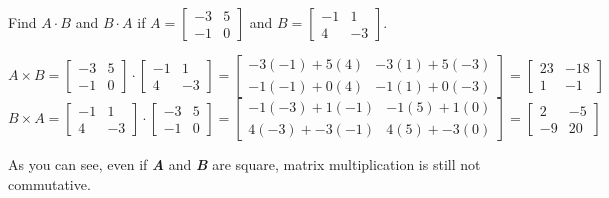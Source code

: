 \begin{Exercise}[title=Are Matrices Commutative?,label=mult_mat3]
    Find $\mathbf{\mathit{A}} \cdot \mathbf{\mathit{B}}$ and
    $\mathbf{\mathit{B}} \cdot \mathbf{\mathit{A}}$ if $\mathbf{\mathit{A}} =
    \begin{bmatrix}
    -3 & 5\\
    -1 & 0
    \end{bmatrix}$ and $\mathbf{\mathit{B}} = \begin{bmatrix}
    -1 & 1\\
    4 & -3
    \end{bmatrix}$.
\end{Exercise}
\begin{Answer}[ref=mult_mat3]
    $$\mathbf{\mathit{A}} \times \mathbf{\mathit{B}} =
    \begin{bmatrix}
    -3 & 5\\
    -1 & 0
    \end{bmatrix} \cdot \begin{bmatrix}
    -1 & 1\\
    4 & -3
    \end{bmatrix} = \begin{bmatrix}
    -3(-1) + 5(4) & -3(1) + 5(-3)\\
    -1(-1) + 0(4) & -1(1) + 0(-3)
    \end{bmatrix} = \begin{bmatrix}
    23 & -18\\
    1 & -1
    \end{bmatrix}$$
    $$\mathbf{\mathit{B}} \times \mathbf{\mathit{A}} = \begin{bmatrix}
    -1 & 1\\
    4 & -3
    \end{bmatrix} \cdot \begin{bmatrix}
    -3 & 5\\
    -1 & 0
    \end{bmatrix} = \begin{bmatrix}
    -1(-3) + 1(-1) & -1(5) + 1(0)\\
    4(-3) + -3(-1) & 4(5) + -3(0)
    \end{bmatrix} = \begin{bmatrix}
    2 & -5\\
    -9 & 20
    \end{bmatrix}$$
\end{Answer}


As you can see, even if \textbf{\textit{A}} and \textbf{\textit{B}} are square,
matrix multiplication is still not commutative.

